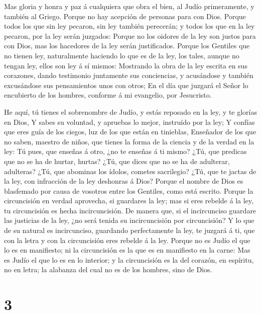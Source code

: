  Mas gloria y honra y paz á cualquiera que obra el bien, al
Judío primeramente, y también al Griego.  Porque no hay
acepción de personas para con Dios.  Porque todos los que
sin ley pecaron, sin ley también perecerán; y todos los que en la ley
pecaron, por la ley serán juzgados:  Porque no los oidores
de la ley son justos para con Dios, mas los hacedores de la ley serán
justificados.  Porque los Gentiles que no tienen ley,
naturalmente haciendo lo que es de la ley, los tales, aunque no tengan
ley, ellos son ley á sí mismos:  Mostrando la obra de la
ley escrita en sus corazones, dando testimonio juntamente sus
conciencias, y acusándose y también excusándose sus pensamientos unos
con otros;  En el día que juzgará el Señor lo encubierto de
los hombres, conforme á mi evangelio, por Jesucristo.

 He aquí, tú tienes el sobrenombre de Judío, y estás
reposado en la ley, y te glorías en Dios,  Y sabes su
voluntad, y apruebas lo mejor, instruído por la ley;  Y
confías que eres guía de los ciegos, luz de los que están en tinieblas,
 Enseñador de los que no saben, maestro de niños, que
tienes la forma de la ciencia y de la verdad en la ley:  Tú
pues, que enseñas á otro, ¿no te enseñas á ti mismo? ¿Tú, que predicas
que no se ha de hurtar, hurtas?  ¿Tú, que dices que no se
ha de adulterar, adulteras? ¿Tú, que abominas los ídolos, cometes
sacrilegio?  ¿Tú, que te jactas de la ley, con infracción
de la ley deshonras á Dios?  Porque el nombre de Dios es
blasfemado por causa de vosotros entre los Gentiles, como está escrito.
 Porque la circuncisión en verdad aprovecha, si guardares
la ley; mas si eres rebelde á la ley, tu circuncisión es hecha
incircuncisión.  De manera que, si el incircunciso guardare
las justicias de la ley, ¿no será tenida su incircuncisión por
circuncisión?  Y lo que de su natural es incircunciso,
guardando perfectamente la ley, te juzgará á ti, que con la letra y con
la circuncisión eres rebelde á la ley.  Porque no es Judío
el que lo es en manifiesto; ni la circuncisión es la que es en
manifiesto en la carne:  Mas es Judío el que lo es en lo
interior; y la circuncisión es la del corazón, en espíritu, no en letra;
la alabanza del cual no es de los hombres, sino de Dios.

\hypertarget{section-2}{%
\section{3}\label{section-2}}

